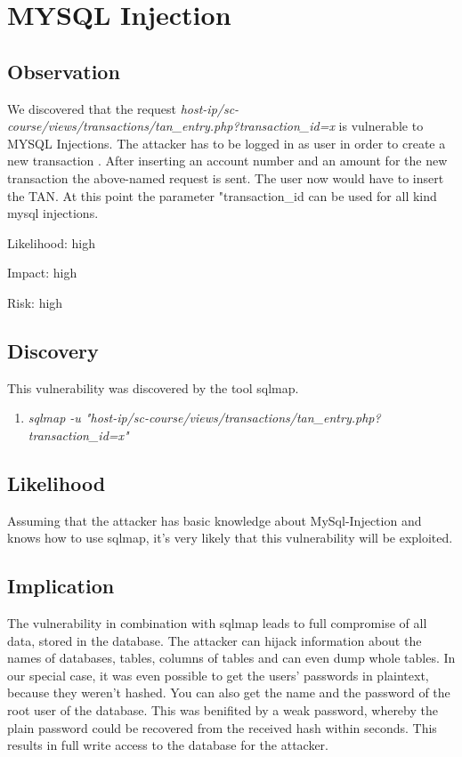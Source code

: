 

\chapter{MYSQL Injection}

\section{Observation}

We discovered that the request \textit{host-ip/sc-course/views/transactions/tan\_entry.php?transaction\_id=x} is vulnerable to MYSQL Injections.
The attacker has to be logged in as user in order to create a new transaction . After inserting an account number and an amount for the new transaction the above-named request is sent. The user now would have to insert the TAN. At this point the parameter "transaction\_id can be used for all kind mysql  injections.


Likelihood: high\newline

Impact:      	high\newline

Risk: high \newline

\section{Discovery}
This vulnerability was discovered by the tool sqlmap. 
\begin{enumerate}
\item \textit{sqlmap -u "host-ip/sc-course/views/transactions/tan\_entry.php?transaction\_id=x"}
\end{enumerate}



\section{Likelihood}
Assuming that the attacker has basic knowledge about MySql-Injection and knows how to use sqlmap, it's very likely that this vulnerability will be exploited.


\section{Implication}
The vulnerability in combination with sqlmap leads to full compromise of all data, stored in the database. The attacker can hijack information about the names of databases, tables, columns of tables and can even dump whole tables.  In our special case, it was even possible to get the users' passwords in plaintext, because they weren't hashed.
You can also get the name and the password of the root user of the database. This was benifited by a weak password, whereby the plain password could be recovered from the received hash within seconds. This results in full write access to the database for the attacker.



